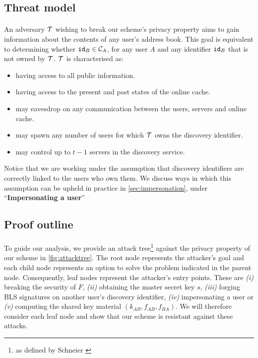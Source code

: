	\subsection{Threat model}
	\paragraph{} An adversary $\mathcal{T}$ wishing to break our scheme's privacy property aims to gain information about the contents of any user's address book. This goal is equivalent to determining whether $\mathtt{id}_B \in \mathcal{C}_{A}$, for any user $A$ and any identifier $\mathtt{id}_B$ that is not owned by $\mathcal{T}$. $\mathcal{T}$ is characterised as:
	\begin{itemize}
		\item having access to all public information.
		\item having access to the present and past states of the online cache.
		\item may eavesdrop on any communication between the users, servers and online cache.
		\item may spawn any number of users for which $\mathcal{T}$ owns the discovery identifier.
		\item may control up to $t-1$ servers in the discovery service.
	\end{itemize}
	
	\noindent Notice that we are working under the assumption that discovery identifiers are correctly linked to the users who own them. We discuss ways in which this assumption can be upheld in practice in \autoref{sec:impersonation}, under ``\textbf{Impersonating a user}''
	
	\subsection{Proof outline}
	
	\paragraph{} To guide our analysis, we provide an attack tree\footnote{as defined by Schneier \cite{attacktree}} against the privacy property of our scheme in \autoref{fig:attacktree}. The root node represents the attacker's goal and each child node represents an option to solve the problem indicated in the parent node. Consequently, leaf nodes represent the attacker's entry points. These are \textit{(i)} breaking the security of $F$, \textit{(ii)} obtaining the master secret key $s$, \textit{(iii)} forging BLS signatures on another user's discovery identifier, \textit{(iv)} impersonating a user or \textit{(v)} computing the shared key material $(k_{AB}, f_{AB}, f_{BA})$. We will therefore consider each leaf node and show that our scheme is resistant against these attacks.
	
